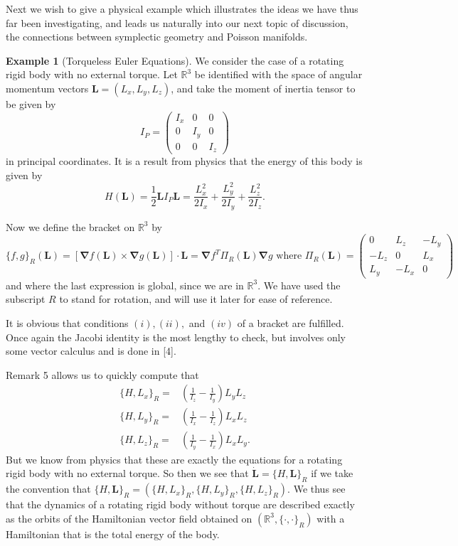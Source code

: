 \documentclass[psamsfonts,12pt]{amsart}
\newcommand\0{\mathbf{0}}
\newcommand\grad{\boldsymbol{\nabla}}
\theoremstyle{plain}
\theoremstyle{definition}
\newtheorem{ex}[thm]{Example} %
\newcommand{\bL}{\mathbf{L}}
\newcommand{\bbR}{\mathbb{R}}
\begin{document}
Next we wish to give a physical example which illustrates the ideas we have thus far been investigating, and leads us naturally into our next topic of discussion, the connections between symplectic geometry and Poisson manifolds.

\begin{ex}[Torqueless Euler Equations]
We consider the case of a rotating rigid body with no external torque.  Let $\bbR^3$ be identified with the space of angular momentum vectors $\bL=(L_x,L_y,L_z)$, and take the moment of inertia tensor to be given by
\[
I_P=\begin{pmatrix} I_x& 0& 0\\ 0& I_y& 0\\ 0& 0& I_z\end{pmatrix}
\]
in principal coordinates.  It is a result from physics that the energy of this body is given by
\[
H(\bL) = \frac{1}{2} \bL I_P \bL=\frac{L_x^2}{2I_x}+\frac{L_y^2}{2I_y}+\frac{L_z^2}{2I_z}.
\]

Now we define the bracket on $\bbR^3$ by
\[
\{f,g\}_R(\bL)=[\grad f(\bL)\times \grad g(\bL)]\cdot \bL=\grad f^T \Pi_R(\bL) \grad g \text{ where } \Pi_R(\bL)= \begin{pmatrix} 0& L_z& -L_y\\ -L_z& 0& L_x\\ L_y& -L_x& 0\end{pmatrix}
\]
and where the last expression is global, since we are in $\bbR^3$.  We have used the subscript $R$ to stand for rotation, and will use it later for ease of reference.

It is obvious that conditions $(i), (ii),$ and $(iv)$ of a bracket are fulfilled.  Once again the Jacobi identity is the most lengthy to check, but involves only some vector calculus and is done in [4].

Remark 5 allows us to quickly compute that
\begin{align*}
\{H,L_x\}_R=& \left(\frac{1}{I_z}-\frac{1}{I_y}\right)L_yL_z\\
\{H,L_y\}_R =& \left(\frac{1}{I_x}-\frac{1}{I_z}\right)L_xL_z\\
\{H,L_z\}_R=& \left(\frac{1}{I_y}-\frac{1}{I_x}\right)L_xL_y.
\end{align*}
But we know from physics that these are exactly the equations for a rotating rigid body with no external torque.  So then we see that $\dot{\bL}=\{H,\bL\}_R$ if we take the convention that $\{H,\bL\}_R=(\{H,L_x\}_R,\{H,L_y\}_R,\{H,L_z\}_R)$.  We thus see that the dynamics of a rotating rigid body without torque are described exactly as the orbits of the Hamiltonian vector field obtained on $(\bbR^3, \{\cdot, \cdot \}_R)$ with a Hamiltonian that is the total energy of the body.


\end{ex}
\end{document}
